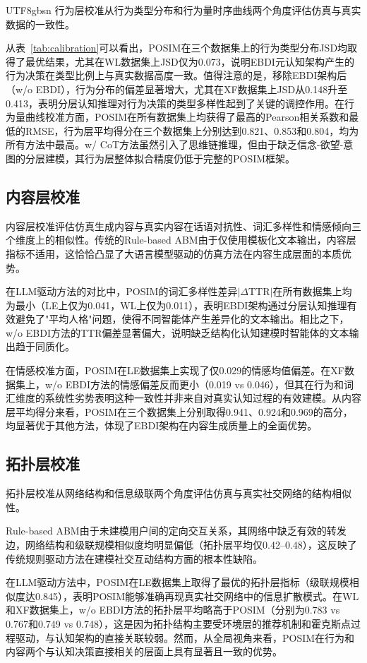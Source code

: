 \documentclass[11pt]{article}
\begin{document}
\begin{CJK}{UTF8}{gbsn}
行为层校准从行为类型分布和行为量时序曲线两个角度评估仿真与真实数据的一致性。

从表~\ref{tab:calibration}可以看出，POSIM在三个数据集上的行为类型分布JSD均取得了最优结果，尤其在WL数据集上JSD仅为0.073，说明EBDI元认知架构产生的行为决策在类型比例上与真实数据高度一致。值得注意的是，移除EBDI架构后（w/o EBDI），行为分布的偏差显著增大，尤其在XF数据集上JSD从0.148升至0.413，表明分层认知推理对行为决策的类型多样性起到了关键的调控作用。在行为量曲线校准方面，POSIM在所有数据集上均获得了最高的Pearson相关系数和最低的RMSE，行为层平均得分在三个数据集上分别达到0.821、0.853和0.804，均为所有方法中最高。w/ CoT方法虽然引入了思维链推理，但由于缺乏信念-欲望-意图的分层建模，其行为层整体拟合精度仍低于完整的POSIM框架。

\subsection{内容层校准}

内容层校准评估仿真生成内容与真实内容在话语对抗性、词汇多样性和情感倾向三个维度上的相似性。传统的Rule-based ABM由于仅使用模板化文本输出，内容层指标不适用，这恰恰凸显了大语言模型驱动的仿真方法在内容生成层面的本质优势。

在LLM驱动方法的对比中，POSIM的词汇多样性差异$|\Delta\text{TTR}|$在所有数据集上均为最小（LE上仅为0.041，WL上仅为0.011），表明EBDI架构通过分层认知推理有效避免了"平均人格"问题，使得不同智能体产生差异化的文本输出。相比之下，w/o EBDI方法的TTR偏差显著偏大，说明缺乏结构化认知建模时智能体的文本输出趋于同质化。

在情感校准方面，POSIM在LE数据集上实现了仅0.029的情感均值偏差。在XF数据集上，w/o EBDI方法的情感偏差反而更小（0.019 vs 0.046），但其在行为和词汇维度的系统性劣势表明这种一致性并非来自对真实认知过程的有效建模。从内容层平均得分来看，POSIM在三个数据集上分别取得0.941、0.924和0.969的高分，均显著优于其他方法，体现了EBDI架构在内容生成质量上的全面优势。

\subsection{拓扑层校准}

拓扑层校准从网络结构和信息级联两个角度评估仿真与真实社交网络的结构相似性。

Rule-based ABM由于未建模用户间的定向交互关系，其网络中缺乏有效的转发边，网络结构和级联规模相似度均明显偏低（拓扑层平均仅0.42--0.48），这反映了传统规则驱动方法在建模社交互动结构方面的根本性缺陷。

在LLM驱动方法中，POSIM在LE数据集上取得了最优的拓扑层指标（级联规模相似度达0.845），表明POSIM能够准确再现真实社交网络中的信息扩散模式。在WL和XF数据集上，w/o EBDI方法的拓扑层平均略高于POSIM（分别为0.783 vs 0.767和0.749 vs 0.748），这是因为拓扑结构主要受环境层的推荐机制和霍克斯点过程驱动，与认知架构的直接关联较弱。然而，从全局视角来看，POSIM在行为和内容两个与认知决策直接相关的层面上具有显著且一致的优势。


\end{CJK}
\end{document}
